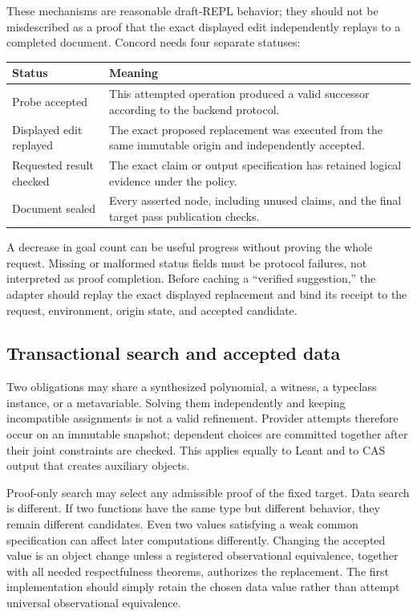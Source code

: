 \documentclass[11pt,a4paper]{article}
\theoremstyle{remark}
\begin{document}
These mechanisms are reasonable draft-REPL behavior; they should not be
misdescribed as a proof that the exact displayed edit independently replays to
a completed document. Concord needs four separate statuses:
\begin{center}
\begin{tabularx}{\textwidth}{@{}L{.26\textwidth}Y@{}}
\toprule
Status & Meaning \\
\midrule
Probe accepted & This attempted operation produced a valid successor according
to the backend protocol.\\
Displayed edit replayed & The exact proposed replacement was executed from the
same immutable origin and independently accepted.\\
Requested result checked & The exact claim or output specification has retained
logical evidence under the policy.\\
Document sealed & Every asserted node, including unused claims, and the final
target pass publication checks.\\
\bottomrule
\end{tabularx}
\end{center}
A decrease in goal count can be useful progress without proving the whole
request. Missing or malformed status fields must be protocol failures, not
interpreted as proof completion. Before caching a ``verified suggestion,'' the
adapter should replay the exact displayed replacement and bind its receipt to
the request, environment, origin state, and accepted candidate.

\subsection{Transactional search and accepted data}
Two obligations may share a synthesized polynomial, a witness, a typeclass
instance, or a metavariable. Solving them independently and keeping incompatible
assignments is not a valid refinement. Provider attempts therefore occur on an
immutable snapshot; dependent choices are committed together after their joint
constraints are checked. This applies equally to Leant and to CAS output that
creates auxiliary objects.

Proof-only search may select any admissible proof of the fixed target. Data
search is different. If two functions have the same type but different behavior,
they remain different candidates. Even two values satisfying a weak common
specification can affect later computations differently. Changing the accepted
value is an object change unless a registered observational equivalence, together
with all needed respectfulness theorems, authorizes the replacement. The first
implementation should simply retain the chosen data value rather than attempt
universal observational equivalence.
\end{document}
